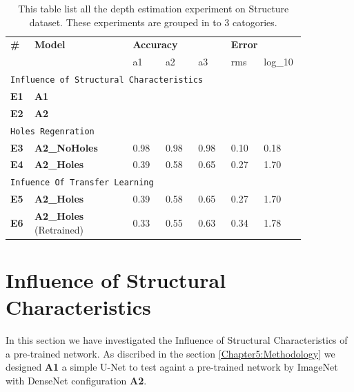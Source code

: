 \begin{table}[h]
\begin{tabular}{p{0.05\linewidth}p{0.3\linewidth}p{0.1\linewidth}p{0.1\linewidth}p{0.1\linewidth}p{0.1\linewidth}p{0.1\linewidth}}
\hline
\textbf{\#} & \textbf{Model} & \multicolumn{3}{l}{\textbf{Accuracy}} & \multicolumn{2}{l}{\textbf{Error}} \\ \cline{3-7} 
                    &                        & a1       & a2       & a3      & rms         & log\_10      \\ \hline
\multicolumn{7}{l}{\texttt{Influence of Structural Characteristics}}                                            \\ \hline
\textbf{E1}                  &  \textbf{A1}               &          &          &         &             &              \\ \hline
\textbf{E2}                  & \textbf{A2}                  &          &          &         &             &              \\ \hline
\multicolumn{7}{l}{\texttt{Holes Regenration}}                                                                   \\ \hline
\textbf{E3}                  & \textbf{A2\_NoHoles}            & 0.98   & 0.98   & 0.98  & 0.10       & 0.18        \\ \hline
\textbf{E4}                  & \textbf{A2\_Holes}              & 0.39   & 0.58   & 0.65  & 0.27      & 1.70       \\ \hline
\multicolumn{7}{l}{\texttt{Infuence Of Transfer Learning}}                                                       \\ \hline
\textbf{E5}                  & \textbf{A2\_Holes}              & 0.39   & 0.58   & 0.65  & 0.27      & 1.70       \\ \hline
\textbf{E6}                  & \textbf{A2\_Holes} (Retrained) & 0.33   & 0.55   & 0.63  & 0.34      & 1.78       \\ \hline
\end{tabular}

\caption{This table list all the depth estimation experiment on Structure dataset. These experiments are grouped in to 3 catogories.}
\end{table}

\section{Influence of Structural Characteristics}
\label{Chapter6:Influence_Structural_Char}
In this section we have investigated the Influence of Structural Characteristics of a pre-trained network.  As discribed in the section \ref{Chapter5:Methodology} we designed \textbf{A1} a simple U-Net to test againt a pre-trained network by ImageNet with DenseNet configuration \textbf{A2}. 
 
